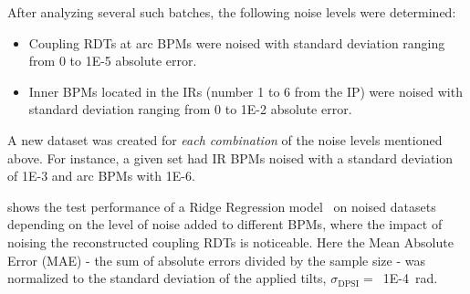 After analyzing several such batches, the following noise levels were determined:
\begin{itemize}
  \item Coupling RDTs at arc BPMs were noised with standard deviation ranging from \num{0} to \num{1E-5} absolute error.
  \item Inner BPMs located in the IRs (number \num{1} to \num{6} from the IP) were noised with standard deviation ranging from \num{0} to \num{1E-2} absolute error.
\end{itemize}

A new dataset was created for \textit{each combination} of the noise levels mentioned above.
For instance, a given set had IR BPMs noised with a standard deviation of \num{1E-3} and arc BPMs with \num{1E-6}.

 shows the test performance of a Ridge Regression model~\cite{MIT:Rifkin:Regularized_Least_Squares} on noised datasets depending on the level of noise added to different BPMs, where the impact of noising the reconstructed coupling RDTs is noticeable.
Here the Mean Absolute Error (MAE) - the sum of absolute errors divided by the sample size - was normalized to the standard deviation of the applied tilts, \(\sigma_{\mathrm{DPSI}} =\)~\qty{1E-4}{\radian}.

